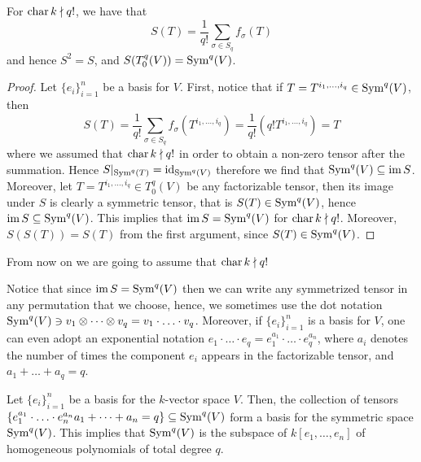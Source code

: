\begin{proposition}
    For \(\operatorname{char} k \nmid q!\), we have that
    \[
        S(T) = \frac{1}{q!} \sum_{\sigma \in S_q} f_\sigma(T)
    \]
    and hence \(S^2 = S\), and \(S(T_0^q(V)) = \operatorname{Sym}^q(V)\).
\end{proposition}

\begin{proof}
    Let \(\{e_i\}_{i=1}^n\) be a basis for \(V\). First, notice that if \(T =
    T^{i_1, \dots, i_q} \in \operatorname{Sym}^q(V)\),
    then
    \[
        S(T) = \frac{1}{q!} \sum_{\sigma \in S_q} f_\sigma(T^{i_1, \dots,
            i_q}) = \frac{1}{q!} (q! T^{i_1, \dots, i_q}) = T
    \]
    where we assumed that \(\operatorname{char} k \nmid q!\) in order to obtain a non-zero tensor
    after the summation. Hence \(S|_{\operatorname{Sym}^q(T)} = \operatorname{id}_{\operatorname{Sym}^q(V)}\) therefore we
    find that \(\operatorname{Sym}^q(V) \subseteq \operatorname{im} S\). Moreover, let \(T = T^{i_1, \dots,
            i_q} \in T_0^q(V)\) be any factorizable tensor, then its image under \(S\) is
    clearly a symmetric tensor, that is \(S(T) \in \operatorname{Sym}^q(V)\), hence \(\operatorname{im} S
    \subseteq \operatorname{Sym}^q(V)\). This implies that \(\operatorname{im} S = \operatorname{Sym}^q(V)\) for \(\operatorname{char} k
    \nmid q!\). Moreover, \(S(S(T)) = S(T)\) from the first argument, since
    \(S(T) \in \operatorname{Sym}^q(V)\).
\end{proof}

\begin{remark}
    From now on we are going to assume that \(\operatorname{char} k \nmid q!\)
\end{remark}

\begin{notation}
    Notice that since \(\operatorname{im} S = \operatorname{Sym}^q(V)\) then we can write any symmetrized
    tensor in any permutation that we choose, hence, we sometimes use the dot
    notation \(\operatorname{Sym}^q(V) \ni v_1 \otimes \dots \otimes v_q = v_1 \cdot \ldots
    \cdot v_q\). Moreover, if \(\{e_i\}_{i=1}^n\) is a basis for \(V\), one can
    even adopt an exponential notation \(e_1 \cdot \ldots \cdot e_q = e_1^{a_1}
    \cdot \ldots \cdot e_q^{a_n}\), where \(a_i\) denotes the number of times the
    component \(e_i\) appears in the factorizable tensor, and \(a_1 + \dots + a_q
    = q\).
\end{notation}

\begin{proposition}
    \label{prop: basis for symmetric power}
    Let \(\{e_i\}_{i=1}^n\) be a basis for the \(k\)-vector space \(V\). Then, the
    collection of tensors \(\{e_1^{a_1} \cdot \ldots \cdot e_n^{a_n} \relax a_1 + \dots
    + a_n = q\} \subseteq \operatorname{Sym}^q(V)\) form a basis for the symmetric space
    \(\operatorname{Sym}^q(V)\). This implies that \(\operatorname{Sym}^q(V)\) is the subspace of \(k[e_1,
            \dots, e_n]\) of homogeneous polynomials of total degree \(q\).
\end{proposition}

